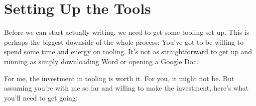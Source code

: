 %
%
%
%
%
%
%
%
%
%

\chapter{Setting Up the Tools} \label{chap:tooling}

Before we can start actually writing, we need to get some tooling set up. This
is perhaps the biggest downside of the whole process: You've got to be willing
to spend some time and energy on tooling. It's not as straightforward to get
up and running as simply downloading Word or opening a Google Doc.

For me, the investment in tooling is worth it. For you, it might not be. But
assuming you're with me so far and willing to make the investment, here's what
you'll need to get going:

